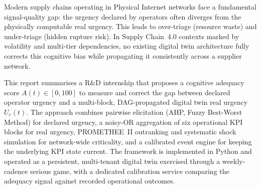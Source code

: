 Modern supply chains operating in Physical Internet networks face a fundamental signal-quality gap: the urgency declared by operators often diverges from the physically computable real urgency. This leads to over-triage (resource waste) and under-triage (hidden rupture risk). In Supply Chain~4.0 contexts marked by volatility and multi-tier dependencies, no existing digital twin architecture fully corrects this cognitive bias while propagating it consistently across a supplier network.

This report summarises a R\&D internship that proposes a cognitive adequacy score $A(t) \in [0, 100]$ to measure and correct the gap between declared operator urgency and a multi-block, DAG-propagated digital twin real urgency $U_r(t)$. The approach combines pairwise elicitation (AHP, Fuzzy Best-Worst Method) for declared urgency, a noisy-OR aggregation of six operational KPI blocks for real urgency, PROMETHEE~II outranking and systematic shock simulation for network-wide criticality, and a calibrated event engine for keeping the underlying KPI state current. The framework is implemented in Python and operated as a persistent, multi-tenant digital twin exercised through a weekly-cadence serious game, with a dedicated calibration service comparing the adequacy signal against recorded operational outcomes.
